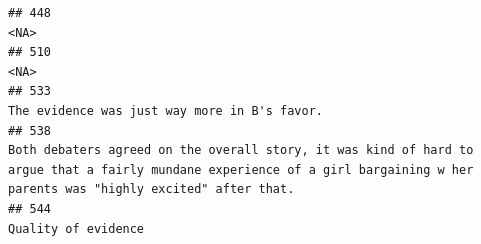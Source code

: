 \documentclass[
]{article}
\begin{document}
\begin{verbatim}
## 448                                                                                                                                                                                                                                                                                                                                                                                                                                                                                                                                                                                               <NA>
## 510                                                                                                                                                                                                                                                                                                                                                                                                                                                                                                                                                                                               <NA>
## 533                                                                                                                                                                                                                                                                                                                                                                                                                                                                                                                                                       The evidence was just way more in B's favor.
## 538                                                                                                                                                                                                                                                                                                                                                                                                                       Both debaters agreed on the overall story, it was kind of hard to argue that a fairly mundane experience of a girl bargaining w her parents was "highly excited" after that.
## 544                                                                                                                                                                                                                                                                                                                                                                                                                                                                                                                                                                                Quality of evidence

\end{verbatim}
\end{document}

